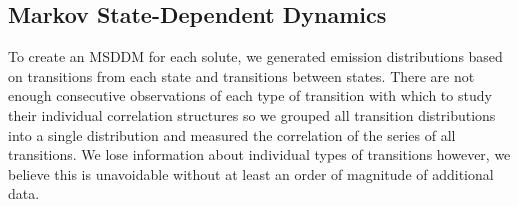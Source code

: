 \documentclass{article}
\begin{document}


  \subsection{Markov State-Dependent Dynamics}\label{section:msm_results}
  
  To create an MSDDM for each solute, we generated emission distributions based 
  on transitions from each state and transitions between states. There are not
  enough consecutive observations of each type of transition with which to study
  their individual correlation structures so we grouped all transition distributions
  into a single distribution and measured the correlation of the series of all 
  transitions. We lose information about individual types of transitions however, 
  we believe this is unavoidable without at least an order of magnitude of additional data.
  
\end{document}

